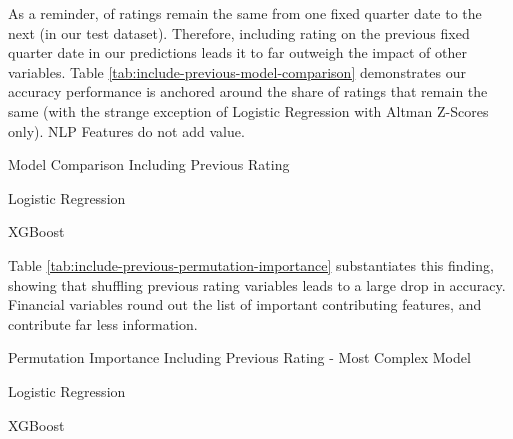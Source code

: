 \documentclass{article}[11pt]
\begin{document}
    \label{sec:include-previous-rating}

    As a reminder, \shareNotChanges \space of ratings remain the same from one fixed quarter date to the next (\shareNotChangesTest \space in our test dataset). Therefore, including rating on the previous fixed quarter date in our predictions leads it to far outweigh the impact of other variables. Table \ref{tab:include-previous-model-comparison} demonstrates our accuracy performance is anchored around the share of ratings that remain the same (with the strange exception of Logistic Regression with Altman Z-Scores only). NLP Features do not add value.

    \begin{table}[h!]
        \centering
        \caption{Model Comparison Including Previous Rating}
        \begin{minipage}[c]{0.495\linewidth}
            \centering
            
            \caption*{\footnotesize Logistic Regression} 
        \end{minipage}
        \begin{minipage}[c]{0.495\linewidth}
            \centering
            
            \caption*{\footnotesize XGBoost} 
        \end{minipage}
        \label{tab:include-previous-model-comparison}
    \end{table}

    Table \ref{tab:include-previous-permutation-importance} substantiates this finding, showing that shuffling previous rating variables leads to a large drop in accuracy. Financial variables round out the list of important contributing features, and contribute far less information.

    \begin{table}[h!]
        \centering
        \caption{Permutation Importance Including Previous Rating - Most Complex Model}
        \begin{minipage}[c]{0.495\linewidth}
            \centering
            
            \caption*{\footnotesize Logistic Regression} 
        \end{minipage}
        \begin{minipage}[c]{0.495\linewidth}
            \centering
            
            \caption*{\footnotesize XGBoost} 
        \end{minipage}
        \label{tab:include-previous-permutation-importance}
    \end{table}
\end{document}
